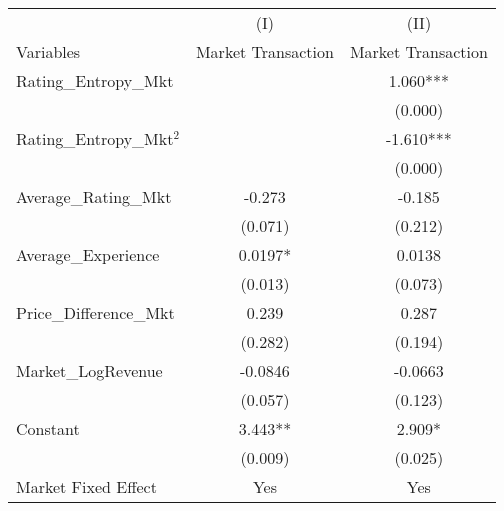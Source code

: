 \begin{table}[]
\centering
\begin{threeparttable}[t]
\begin{tabular}{@{}lcc@{}}
\toprule
                                    & (I)                   & (II)                  \\
Variables                                    & Market Transaction & Market Transaction\\ \midrule
Rating\_Entropy\_Mkt                         &                       & 1.060***              \\
                                             &                       & (0.000)               \\
Rating\_Entropy\_Mkt$^2$                     &                       & -1.610***             \\
                                             &                       & (0.000)               \\
Average\_Rating\_Mkt                         & -0.273                & -0.185                \\
                                             & (0.071)               & (0.212)               \\
Average\_Experience                          & 0.0197*               & 0.0138                \\
                                             & (0.013)               & (0.073)               \\
Price\_Difference\_Mkt                       & 0.239                 & 0.287                 \\
                                             & (0.282)               & (0.194)               \\
Market\_LogRevenue                           & -0.0846               & -0.0663               \\
                                             & (0.057)               & (0.123)               \\
Constant                                     & 3.443**               & 2.909*                \\
                                             & (0.009)               & (0.025)               \\
Market Fixed Effect                          & Yes                   & Yes                   \\

\end{tabular}
\end{threeparttable}
\end{table}

